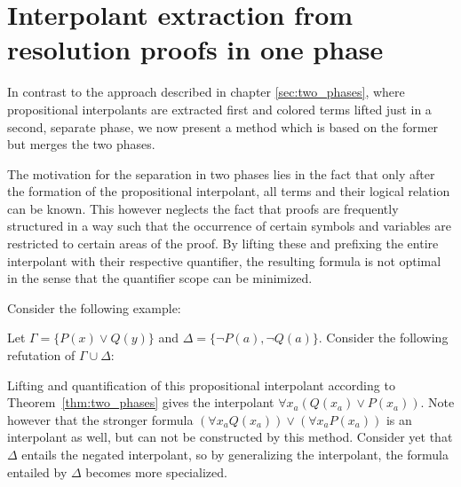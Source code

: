 \chapter{Interpolant extraction from resolution proofs in one phase}
\label{sec:one_phase}
\label{chap:one_phase}

In contrast to the approach described in chapter \ref{sec:two_phases}, where propositional interpolants are extracted first and colored terms lifted just in a second, separate phase, 
we now present a method which is based on the former but merges the two phases.

The motivation for the separation in two phases lies in the fact that only after the formation of the propositional interpolant, all terms and their logical relation can be known.
This however neglects the fact that proofs are frequently structured in a way such that the occurrence of certain symbols and variables are restricted to certain areas of the proof.
By lifting these and prefixing the entire interpolant with their respective quantifier, the resulting formula is not optimal in the sense that the quantifier scope can be minimized.

Consider the following example:

\begin{exa}
	\label{exa:one_phase_motivation}
	Let $\Gamma = \{ P(x) \lor Q(y) \}$ and $\Delta = \{\lnot P(a), \lnot Q(a)\}$.
	Consider the following refutation of $\Gamma \cup \Delta$:
	
	\begin{prooftree}
	\end{prooftree}

	Lifting and quantification of this propositional interpolant according to Theorem~\ref{thm:two_phases} gives the interpolant $\forall x_a (Q(x_a) \lor P(x_a))$.
	Note however that the stronger formula $(\forall x_a Q(x_a) ) \lor (\forall x_a P(x_a))$ is an interpolant as well, but can not be constructed by this method.
	Consider yet that $\Delta$ entails the negated interpolant, so by generalizing the interpolant, the formula entailed by $\Delta$ becomes more specialized.
\end{exa}


